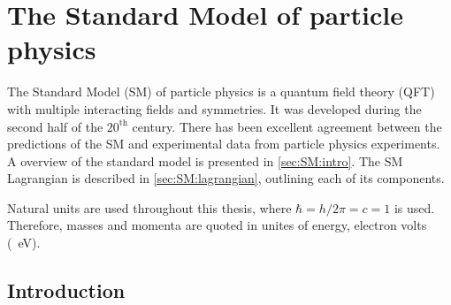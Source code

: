 \def \vacr {{\lvert\mkern1.5mu0\mkern1.5mu\rangle}}
\def \vacl {{\langle\mkern1.5mu0\mkern1.5mu\rvert}}

\chapter{The Standard Model of particle physics}\label{chap:SM}



The Standard Model (SM) of particle physics is a quantum field theory (QFT) with multiple interacting fields and symmetries. It was developed during the second half of the $20^{\mathrm{th}}$ century. There has been excellent agreement between the predictions of the SM and experimental data from particle physics experiments. A overview of the standard model is presented in \cref{sec:SM:intro}. The SM Lagrangian is described in \cref{sec:SM:lagrangian}, outlining each of its components.

Natural units are used throughout this thesis, where $\hbar=h/2\pi=c=1$ is used. Therefore, masses and momenta are quoted in unites of energy, electron volts (\SI{}{\electronvolt}). 
\section{Introduction}

